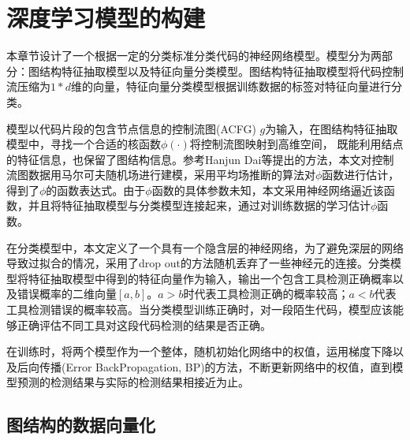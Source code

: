 \chapter{深度学习模型的构建}
本章节设计了一个根据一定的分类标准分类代码的神经网络模型。模型分为两部分：图结构特征抽取模型以及特征向量分类模型。图结构特征抽取模型将代码控制流压缩为$1*d$维的向量，特征向量分类模型根据训练数据的标签对特征向量进行分类。
\par 模型以代码片段的包含节点信息的控制流图(ACFG) $g$为输入，在图结构特征抽取模型中，寻找一个合适的核函数$\phi(\cdot)$将控制流图映射到高维空间， 既能利用结点的特征信息，也保留了图结构信息。参考Hanjun Dai\cite{dai2016discriminative}等提出的方法，本文对控制流图数据用马尔可夫随机场进行建模，采用平均场推断的算法对$\phi$函数进行估计，得到了$\phi$的函数表达式。由于$\phi$函数的具体参数未知，本文采用神经网络逼近该函数，并且将特征抽取模型与分类模型连接起来，通过对训练数据的学习估计$\phi$函数。
\par 在分类模型中，本文定义了一个具有一个隐含层的神经网络，为了避免深层的网络导致过拟合的情况，采用了drop out的方法随机丢弃了一些神经元的连接。分类模型将特征抽取模型中得到的特征向量作为输入，输出一个包含工具检测正确概率以及错误概率的二维向量$[a, b]$。$a>b$时代表工具检测正确的概率较高；$a<b$代表工具检测错误的概率较高。当分类模型训练正确时，对一段陌生代码，模型应该能够正确评估不同工具对这段代码检测的结果是否正确。
\par 在训练时，将两个模型作为一个整体，随机初始化网络中的权值，运用梯度下降以及后向传播(Error BackPropagation, BP)的方法，不断更新网络中的权值，直到模型预测的检测结果与实际的检测结果相接近为止。
\label{chap:deeplearning}
\section{图结构的数据向量化}
